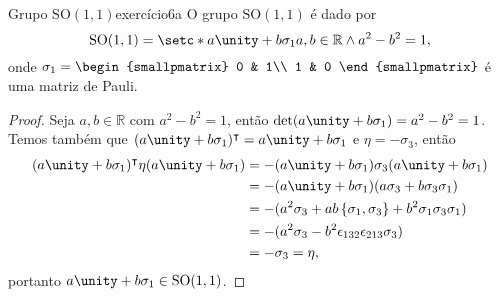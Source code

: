 \begin{proposition}{Grupo \(\mathrm{SO}(1,1)\)}{exercício6a}
    O grupo \(\mathrm{SO}(1,1)\) é dado por
    \begin{equation*}
        \mathrm{SO}(1,1) = \setc*{a \unity + b \sigma_1}{a, b\in \mathbb{R} \land a^2 - b^2 = 1},
    \end{equation*}
    onde \(\sigma_1 = \begin{smallpmatrix}
        0 & 1\\
        1 & 0
    \end{smallpmatrix}\) é uma matriz de Pauli.
\end{proposition}
\begin{proof}
    Seja \(a, b \in \mathbb{R}\) com \(a^2 - b^2 = 1\), então \(\det(a \unity + b \sigma_1) = a^2 - b^2 = 1\). Temos também que \((a\unity+b \sigma_1)^\intercal = a\unity + b \sigma_1\) e \(\eta = - \sigma_3\), então
    \begin{align*}
        (a \unity + b \sigma_1)^\intercal \eta (a \unity + b \sigma_1)
        &= -(a \unity + b \sigma_1)\sigma_3 (a \unity + b \sigma_1)\\
        &= -(a \unity + b \sigma_1)(a \sigma_3 + b \sigma_3 \sigma_1)\\
        &= -(a^2 \sigma_3 + ab \left\{\sigma_1, \sigma_3\right\} + b^2 \sigma_1 \sigma_3 \sigma_1)\\
        &= - (a^2 \sigma_3 - b^2 \epsilon_{132}\epsilon_{213} \sigma_3)\\
        &= - \sigma_3 = \eta,
    \end{align*}
    portanto \(a \unity + b \sigma_1 \in \mathrm{SO}(1,1)\).


\end{proof}
